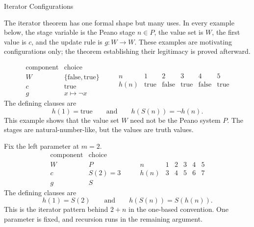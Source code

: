 \begin{topicbox}{Iterator Configurations}
\begin{exposition}
The iterator theorem has one formal shape but many uses. In every example
below, the stage variable is the Peano stage $n\in P$, the value set is $W$,
the first value is $c$, and the update rule is $g:W\to W$. These examples are
motivating configurations only; the theorem establishing their legitimacy is
proved afterward.
\end{exposition}

\begin{remark*}
\[
\begin{array}{c|c}
\text{component} & \text{choice}\\ \hline
W & \{\text{false},\text{true}\}\\
c & \text{true}\\
g & x\mapsto \neg x
\end{array}
\qquad
\begin{array}{c|ccccc}
n & 1 & 2 & 3 & 4 & 5\\ \hline
h(n) & \text{true} & \text{false} & \text{true} & \text{false} & \text{true}
\end{array}
\]
The defining clauses are
\[
h(1)=\text{true}
\qquad\text{and}\qquad
h(S(n))=\neg h(n).
\]
This example shows that the value set $W$ need not be the Peano system $P$.
The stages are natural-number-like, but the values are truth values.
\end{remark*}

\begin{remark*}
Fix the left parameter at $m=2$.
\[
\begin{array}{c|c}
\text{component} & \text{choice}\\ \hline
W & P\\
c & S(2)=3\\
g & S
\end{array}
\qquad
\begin{array}{c|ccccc}
n & 1 & 2 & 3 & 4 & 5\\ \hline
h(n) & 3 & 4 & 5 & 6 & 7
\end{array}
\]
The defining clauses are
\[
h(1)=S(2)
\qquad\text{and}\qquad
h(S(n))=S(h(n)).
\]
This is the iterator pattern behind $2+n$ in the one-based convention. One
parameter is fixed, and recursion runs in the remaining argument.
\end{remark*}


\end{topicbox}
